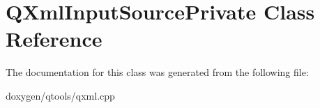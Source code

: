 \hypertarget{class_q_xml_input_source_private}{}\section{Q\+Xml\+Input\+Source\+Private Class Reference}
\label{class_q_xml_input_source_private}


The documentation for this class was generated from the following file\+:\begin{DoxyCompactItemize}
\item 
doxygen/qtools/qxml.\+cpp\end{DoxyCompactItemize}
